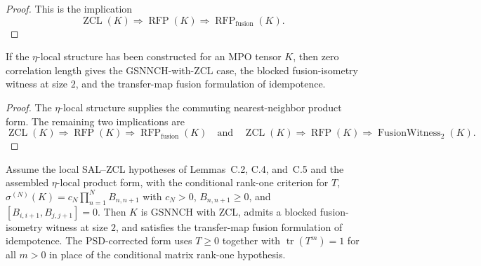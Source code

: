 \begin{proof}\leanok
    This is the implication
    \[
        \operatorname{ZCL}(K)
        \Longrightarrow \operatorname{RFP}(K)
        \Longrightarrow \operatorname{RFP}_{\mathrm{fusion}}(K).
    \]
\end{proof}

\begin{theorem}
    \label{thm:simple_mpdo_rfp_chain_of_eta_local_structure}
    \leanok
    If the $\eta$-local structure has been constructed for an
    MPO tensor $K$, then zero correlation length gives the GSNNCH-with-ZCL
    case, the blocked fusion-isometry witness at size $2$, and the
    transfer-map fusion formulation of idempotence.
\end{theorem}

\begin{proof}\leanok
    The $\eta$-local structure supplies the commuting nearest-neighbor product
    form. The remaining two implications are
    \[
        \operatorname{ZCL}(K) \Longrightarrow
        \operatorname{RFP}(K) \Longrightarrow
        \operatorname{RFP}_{\mathrm{fusion}}(K)
        \quad\text{and}\quad
        \operatorname{ZCL}(K) \Longrightarrow
        \operatorname{RFP}(K) \Longrightarrow
        \operatorname{FusionWitness}_{2}(K).
    \]
\end{proof}

\begin{theorem}
    \label{thm:simple_mpdo_rfp_chain_of_sal_zcl_and_eta_local_structure}
    \leanok
    Assume the local SAL--ZCL hypotheses of Lemmas~C.2, C.4, and~C.5 and the assembled
    $\eta$-local product form, with the conditional rank-one criterion for $T$,
    $\sigma^{(N)}(K)=c_N\prod_{n=1}^N B_{n,n+1}$ with $c_N>0$,
    $B_{n,n+1}\ge 0$, and $[B_{i,i+1},B_{j,j+1}]=0$. Then
    $K$ is GSNNCH with ZCL, admits a blocked fusion-isometry witness at size
    $2$, and satisfies the transfer-map fusion formulation of idempotence. The
    PSD-corrected form uses $T\ge0$ together with
    $\operatorname{tr}(T^m)=1$ for all $m>0$ in place of the conditional
    matrix rank-one hypothesis.
\end{theorem}


